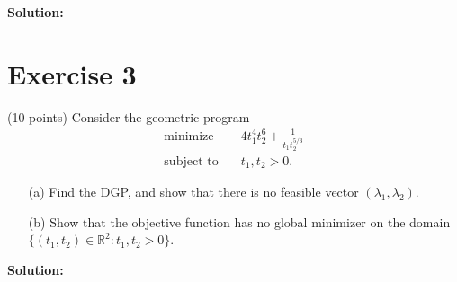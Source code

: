 \documentclass{article}
\begin{document}
\textbf{Solution:} \\



\newpage

\section*{Exercise 3}
(10 points) Consider the geometric program
\begin{align*}
\text{minimize} \quad & 4t_1^4 t_2^6 + \frac{1}{t_1 t_2^{5/3}} \\
\text{subject to} \quad & t_1, t_2 > 0.
\end{align*}

\begin{itemize}
    \item[(a)] Find the DGP, and show that there is no feasible vector $(\lambda_1, \lambda_2)$.
    \item[(b)] Show that the objective function has no global minimizer on the domain $\{(t_1, t_2) \in \mathbb{R}^2 : t_1, t_2 > 0\}$.
\end{itemize}

\textbf{Solution:} \\
\end{document}
